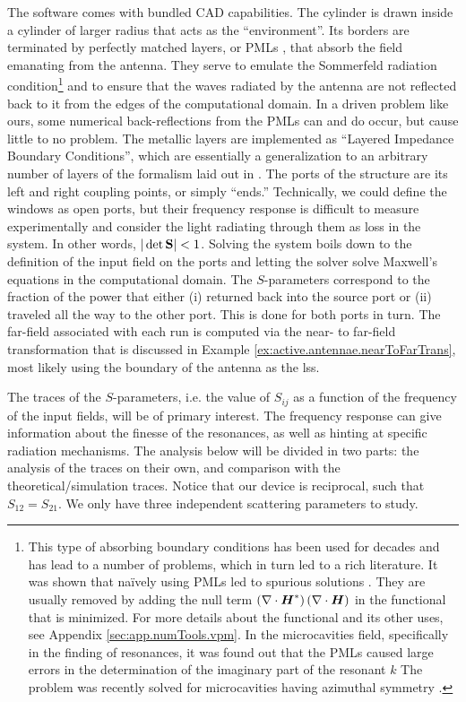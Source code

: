 The software comes with bundled CAD capabilities. The cylinder is drawn inside 
a cylinder of larger radius that acts as the ``environment''. Its borders are
terminated by perfectly matched layers, or PMLs \cite{BER1994}, that absorb the field emanating 
from the antenna. They serve to emulate the Sommerfeld radiation condition\footnote{
This type of absorbing boundary conditions has been used for decades and has lead
to a number of problems, which in turn led to a rich literature. It was shown that naïvely using 
PMLs led to spurious solutions \cite{KON1976,KOS1984,KOS1985}. They are usually removed by
adding the null term $\left(\nabla\cdot\boldsymbol{H}^*\right)\left(\nabla\cdot\boldsymbol{H}\right)$
in the functional that is minimized. For more details about the functional and its
other uses, see Appendix \ref{sec:app.numTools.vpm}.
In the microcavities field, specifically in the finding of resonances, it was 
found out that the PMLs caused large errors in the determination of the
imaginary part of the resonant $k$ \cite{HOW1993,HOE1998,BOR2004} The problem
was recently solved for microcavities having azimuthal symmetry \cite{OXB2007,CHE2013}.}
and to ensure that the waves radiated by the antenna are not reflected back to it
from the edges of the computational domain. In a driven problem like ours, some
numerical back-reflections from the PMLs can and do occur, but cause little
to no problem. The metallic layers are implemented as ``Layered Impedance Boundary
Conditions'', which are essentially a generalization to an arbitrary number of
layers of the formalism laid out in \cite{MIT1968}. The ports of the structure
are its left and right coupling points, or simply ``ends.'' Technically, we could
define the windows as open ports, but their frequency response is difficult to 
measure experimentally and consider the light radiating through them as loss 
in the system. In other words, $|\det\mathbf{S}|<1$. Solving the system boils down
to the definition of the input field on the ports and letting the solver solve
Maxwell's equations in the computational domain. The $S$-parameters correspond
to the fraction of the power that either (i) returned back into the source port
or (ii) traveled all the way to the other port. This is done for both ports in turn. 
The far-field associated with each run is computed via the near- to far-field 
transformation that is discussed in Example \ref{ex:active.antennae.nearToFarTrans}, 
most likely using the boundary of the antenna as the \gls{lss}.

The traces of the $S$-parameters, i.e. the value of $S_{ij}$ as a function of 
the frequency of the input fields, will be of primary interest. The frequency
response can give information about the finesse of the resonances, as well as
hinting at specific radiation mechanisms. The analysis below will be divided
in two parts: the analysis of the traces on their own, and comparison with the 
theoretical/simulation traces. Notice that our device is reciprocal, such that
$S_{12}=S_{21}$. We only have three independent scattering parameters to study.

